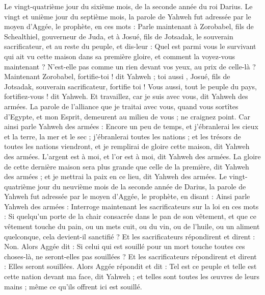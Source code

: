 \begin{multicols}{2}
Le vingt-quatrième jour du sixième mois, de la seconde année du roi Darius.
\VerseOne{}Le vingt et unième jour du septième mois, la parole de Yahweh fut adressée par le moyen d'Aggée, le prophète, en ces mots :
Parle maintenant à Zorobabel, fils de Schealthiel, gouverneur de Juda, et à Josué, fils de Jotsadak, le souverain sacrificateur, et au reste du peuple, et dis-leur :
Quel est parmi vous le survivant qui ait vu cette maison dans sa première gloire, et comment la voyez-vous maintenant ? N'est-elle pas comme un rien devant vos yeux, au prix de celle-là ?
Maintenant Zorobabel, fortifie-toi ! dit Yahweh ;  toi aussi , Josué, fils de Jotsadak, souverain sacrificateur, fortifie toi ! Vous aussi, tout le peuple du pays, fortifiez-vous ! dit Yahweh. Et travaillez, car je suis avec vous, dit Yahweh des armées.
La parole de l'alliance que je traitai avec vous, quand vous sortîtes d'Egypte, et mon Esprit, demeurent au milieu de vous ; ne craignez point.
Car ainsi parle Yahweh des armées : Encore un peu de temps, et j'ébranlerai les cieux et la terre, la mer et le sec ;
j'ébranlerai toutes les nations ; et les trésors de toutes les nations viendront, et je remplirai de gloire cette maison, dit Yahweh des armées.
L'argent est à moi, et l'or est à moi, dit Yahweh des armées.
La gloire de cette dernière maison sera plus grande que celle de la première, dit Yahweh des armées ; et je mettrai la paix en ce lieu, dit Yahweh des armées.
Le vingt-quatrième jour du neuvième mois de la seconde année de Darius, la parole de Yahweh fut adressée par le moyen d'Aggée, le prophète, en disant :
Ainsi parle Yahweh des armées : Interroge maintenant les sacrificateurs sur la loi en ces mots :
Si quelqu'un porte de la chair consacrée dans le pan de son vêtement, et que ce vêtement touche du pain, ou un mets cuit, ou du vin, ou de l'huile, ou un aliment quelconque, cela devient-il sanctifié ? Et les sacrificateurs répondirent et dirent : Non.
Alors Aggée dit : Si celui qui est souillé pour un mort touche toutes ces choses-là, ne seront-elles pas souillées ? Et les sacrificateurs répondirent et dirent : Elles seront souillées.
Alors Aggée répondit et dit : Tel est ce peuple et telle est cette nation devant ma face, dit Yahweh ; et telles sont toutes les œuvres de leurs mains ; même ce qu'ils offrent ici est souillé.

\end{multicols}
